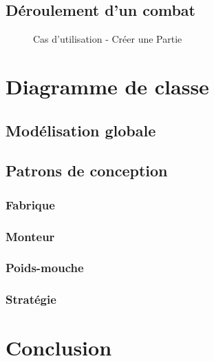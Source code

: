 \documentclass[a4paper,11pt]{article}
\begin{document}
\subsection{Déroulement d'un combat}
\begin{figure}[ht!]
\caption{Cas d'utilisation - Créer une Partie}
\end{figure}

\newpage
\section{Diagramme de classe}
\lipsum[1]
\subsection{Modélisation globale}
\subsection{Patrons de conception}
\subsubsection{Fabrique}
\subsubsection{Monteur}
\subsubsection{Poids-mouche}
\subsubsection{Stratégie}


\newpage
\section*{Conclusion}
\lipsum[1-2]
\end{document}
